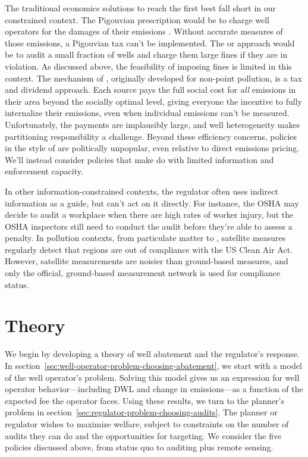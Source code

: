 \documentclass[12pt,oneside,letterpaper]{article}
\theoremstyle{definition}
\begin{document}
\begin{refsection}
The traditional economics solutions to reach the first best fall short in our constrained context.
The Pigouvian prescription would be to charge well operators for the damages of their emissions \parencite{Pigou:1932}.
Without accurate measures of those emissions, a Pigouvian tax can't be implemented.
The \textcite{Becker:1968} or \textcite{Polinsky/Shavell:1979} approach would be to audit a small fraction of wells and charge them large fines if they are in violation.
As discussed above, the feasibility of imposing fines is limited in this context.
The mechanism of \textcite{Segerson:1988}, originally developed for non-point pollution, is a tax and dividend approach.
Each source pays the full social cost for \emph{all} emissions in their area beyond the socially optimal level, giving everyone the incentive to fully internalize their emissions, even when individual emissions can't be measured.
Unfortunately, the payments are implausibly large, and well heterogeneity makes partitioning responsibility a challenge.
Beyond these efficiency concerns, policies in the style of \textcite{Segerson:1988} are politically unpopular, even relative to direct emissions pricing.
We'll instead consider policies that make do with limited information and enforcement capacity.

In other information-constrained contexts, the regulator often uses indirect information as a guide, but can't act on it directly.
For instance, the \gls{OSHA} may decide to audit a workplace when there are high rates of worker injury, but the \gls{OSHA} inspectors still need to conduct the audit before they're able to assess a penalty.
In pollution contexts, from particulate matter to , satellite measures regularly detect that regions are out of compliance with the US Clean Air Act.
However, satellite measurements are noisier than ground-based measures, and only the official, ground-based measurement network is used for compliance status.


\section{Theory}
\label{sec:theory}

We begin by developing a theory of well abatement and the regulator's response.
In section~\ref{sec:well-operator-problem-choosing-abatement}, we start with a model of the well operator's problem.
Solving this model gives us an expression for well operator behavior---including \gls{DWL} and change in emissions---as a function of the expected fee the operator faces.
Using these results, we turn to the planner's problem in section~\ref{sec:regulator-problem-choosing-audits}.
The planner or regulator wishes to maximize welfare, subject to constraints on the number of audits they can do and the opportunities for targeting.
We consider the five policies discussed above, from status quo to auditing plus remote sensing.



\end{refsection}
\end{document}
